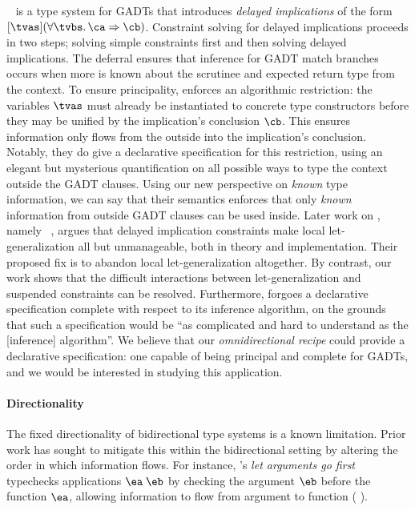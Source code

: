 \documentclass[acmsmall,screen,nonacm%
\Anonymous{,anonymous}{}%
\Final{}{,review}%
]{acmart}
\makeatletter
\newcommand{\BBoutsidein}
   {Vytiniotis-Peyton-Jones-Schrijvers-Sulzmann/outsidein@jfp2011}
\makeatother
\begin{document}
\OutsideIn~\citep*{conf/icfp/SchrijversJSV09} is a type system for GADTs that
introduces \emph{delayed implications} of the form $\where{\tvs}(\all \tvbs \ca
\Rightarrow \cb)$. Constraint solving for delayed implications proceeds in two
steps; solving simple constraints first and then solving delayed implications.
The deferral ensures that inference for GADT match branches occurs when more is
known about the scrutinee and expected return type from the context.
%
To ensure principality, \OutsideIn enforces an algorithmic restriction: the
variables $\tvs$ must already be instantiated to concrete type constructors
before they may be unified by the implication's conclusion $\cb$. This ensures
information only flows from the outside into the implication's conclusion.
Notably, they do give a declarative specification for this restriction, using
an elegant but mysterious quantification on all possible ways to type the
context outside the GADT clauses. Using our new perspective on \emph{known}
type information, we can say that their semantics enforces that only
\emph{known} information from outside GADT clauses can be used inside.
%
Later work on \OutsideIn, namely
\OutsideInX~\citep*{\BBoutsidein},
argues that delayed implication constraints make local let-generalization all
but unmanageable, both in theory and implementation. Their proposed fix is to
abandon local let-generalization altogether. By contrast, our work shows that
the difficult interactions between let-generalization and suspended constraints
can be resolved. Furthermore, \OutsideInX forgoes a declarative specification
complete with respect to its inference algorithm, on the grounds that such a
specification would be ``as complicated and hard to understand as the
[inference] algorithm''. We believe that our \emph{omnidirectional recipe}
could provide a declarative specification: one capable of being principal and
complete for GADTs, and we would be interested in studying this application.

\paragraph{Directionality}
\label{sec/related-work/directionality}

The fixed directionality of bidirectional type systems is a known limitation.
Prior work has sought to mitigate this within the bidirectional setting by
altering the order in which information flows. For instance,
\citet*{conf/esop/XieO18}'s \emph{let arguments go first} typechecks
applications $\eapp \ea \eb$ by checking the argument $\eb$ before the function
$\ea$, allowing information to flow from argument to function (\cf
{}).
\end{document}
